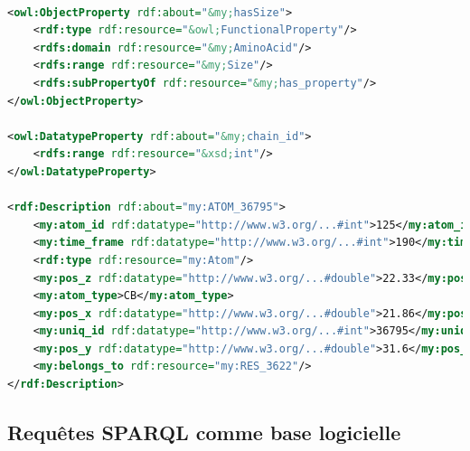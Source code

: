 \begin{lstlisting}[language=XML, caption=Exemple de triplets RDF présents dans notre base de données]

<owl:ObjectProperty rdf:about="&my;hasSize">
    <rdf:type rdf:resource="&owl;FunctionalProperty"/>
    <rdfs:domain rdf:resource="&my;AminoAcid"/>
    <rdfs:range rdf:resource="&my;Size"/>
    <rdfs:subPropertyOf rdf:resource="&my;has_property"/>
</owl:ObjectProperty>

<owl:DatatypeProperty rdf:about="&my;chain_id">
    <rdfs:range rdf:resource="&xsd;int"/>
</owl:DatatypeProperty>

<rdf:Description rdf:about="my:ATOM_36795">
	<my:atom_id rdf:datatype="http://www.w3.org/...#int">125</my:atom_id>
	<my:time_frame rdf:datatype="http://www.w3.org/...#int">190</my:time_frame>
	<rdf:type rdf:resource="my:Atom"/>
	<my:pos_z rdf:datatype="http://www.w3.org/...#double">22.33</my:pos_z>
	<my:atom_type>CB</my:atom_type>
	<my:pos_x rdf:datatype="http://www.w3.org/...#double">21.86</my:pos_x>
	<my:uniq_id rdf:datatype="http://www.w3.org/...#int">36795</my:uniq_id>
	<my:pos_y rdf:datatype="http://www.w3.org/...#double">31.6</my:pos_y>
	<my:belongs_to rdf:resource="my:RES_3622"/>
</rdf:Description>

\end{lstlisting}

\subsection{Requêtes SPARQL comme base logicielle}

